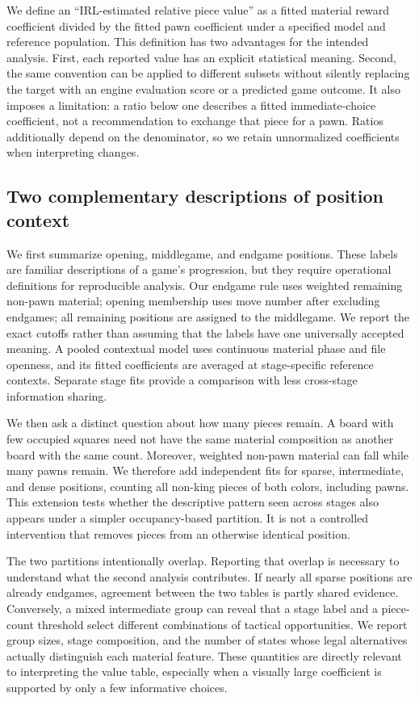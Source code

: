 \documentclass{jcst}
\begin{document}
We define an ``IRL-estimated relative piece value'' as a fitted material reward coefficient divided by the fitted pawn coefficient under a specified model and reference population. This definition has two advantages for the intended analysis. First, each reported value has an explicit statistical meaning. Second, the same convention can be applied to different subsets without silently replacing the target with an engine evaluation score or a predicted game outcome. It also imposes a limitation: a ratio below one describes a fitted immediate-choice coefficient, not a recommendation to exchange that piece for a pawn. Ratios additionally depend on the denominator, so we retain unnormalized coefficients when interpreting changes.

\subsection{Two complementary descriptions of position context}
We first summarize opening, middlegame, and endgame positions. These labels are familiar descriptions of a game's progression, but they require operational definitions for reproducible analysis. Our endgame rule uses weighted remaining non-pawn material; opening membership uses move number after excluding endgames; all remaining positions are assigned to the middlegame. We report the exact cutoffs rather than assuming that the labels have one universally accepted meaning. A pooled contextual model uses continuous material phase and file openness, and its fitted coefficients are averaged at stage-specific reference contexts. Separate stage fits provide a comparison with less cross-stage information sharing.

We then ask a distinct question about how many pieces remain. A board with few occupied squares need not have the same material composition as another board with the same count. Moreover, weighted non-pawn material can fall while many pawns remain. We therefore add independent fits for sparse, intermediate, and dense positions, counting all non-king pieces of both colors, including pawns. This extension tests whether the descriptive pattern seen across stages also appears under a simpler occupancy-based partition. It is not a controlled intervention that removes pieces from an otherwise identical position.

The two partitions intentionally overlap. Reporting that overlap is necessary to understand what the second analysis contributes. If nearly all sparse positions are already endgames, agreement between the two tables is partly shared evidence. Conversely, a mixed intermediate group can reveal that a stage label and a piece-count threshold select different combinations of tactical opportunities. We report group sizes, stage composition, and the number of states whose legal alternatives actually distinguish each material feature. These quantities are directly relevant to interpreting the value table, especially when a visually large coefficient is supported by only a few informative choices.
\end{document}
